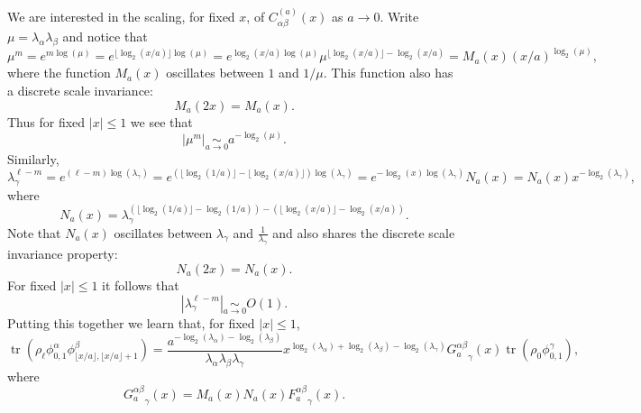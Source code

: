 \documentclass[prl,twocolumn,lengthcheck,superscriptaddress]{revtex4-1}
\newcommand{\tr}{\operatorname{tr}}
\theoremstyle{definition}
\theoremstyle{remark}
\begin{document}
We are interested in the scaling, for fixed $x$, of $C_{\alpha\beta}^{(a)}(x)$ as $a\rightarrow 0$. Write $\mu = \lambda_\alpha\lambda_\beta$ and notice that
\begin{equation}	
	\mu^{m} = e^{m\log(\mu)}	= e^{\lfloor \log_2(x/a)\rfloor \log(\mu)} = e^{\log_2(x/a) \log(\mu)}\mu^{\lfloor \log_2(x/a)\rfloor-\log_2(x/a) } = M_a(x) (x/a)^{\log_2(\mu)},
\end{equation}
where the function $M_a(x)$ oscillates between $1$ and $1/\mu$. This function also has a discrete scale invariance:
\begin{equation}
	M_a(2x) = M_a(x).
\end{equation}
Thus for fixed $|x| \le 1$ we see that
\begin{equation}
|\mu^{m}| \underset{a\rightarrow 0}{\sim} a^{-\log_2(\mu)}.
\end{equation}
Similarly,
\begin{equation}	
	\lambda_\gamma^{\ell-m} = e^{(\ell-m)\log(\lambda_\gamma)} = e^{(\lfloor \log_2(1/a)\rfloor-\lfloor \log_2(x/a)\rfloor) \log(\lambda_\gamma)} = e^{- \log_2(x) \log(\lambda_\gamma)}N_a(x) = N_a(x)x^{-\log_2(\lambda_\gamma)},
\end{equation}
where
\begin{equation}
	N_a(x) = \lambda_\gamma^{(\lfloor \log_2(1/a)\rfloor-  \log_2(1/a))-(\lfloor \log_2(x/a)\rfloor -\log_2(x/a))}.
\end{equation}
Note that $N_a(x)$ oscillates between $\lambda_\gamma$ and $\frac{1}{\lambda_\gamma}$ and also shares the discrete scale invariance property:
\begin{equation}
	 N_a(2x) = N_a(x). 
\end{equation}
For fixed $|x| \le1$ it follows that
\begin{equation}
	|\lambda_\gamma^{\ell-m}| \underset{a\rightarrow 0}{\sim} O(1).
\end{equation}
Putting this together we learn that, for fixed $|x| \le 1 $,
\begin{equation}
	\tr(\rho_{\ell}\phi_{0,1}^{\alpha}\phi_{\lfloor x/a \rfloor,\lfloor x/a \rfloor+1}^{\beta}) =  \frac{a^{-\log_2(\lambda_\alpha) -\log_2(\lambda_\beta)}}{\lambda_\alpha\lambda_\beta\lambda_\gamma} x^{\log_2(\lambda_\alpha)+\log_2(\lambda_\beta)-\log_2(\lambda_\gamma)}{G_a^{\alpha\beta}}_\gamma(x)\tr(\rho_{0} \phi_{0,1}^\gamma),
\end{equation}
where
\begin{equation}
	{G_a^{\alpha\beta}}_\gamma(x) = M_a(x)N_a(x){F_a^{\alpha\beta}}_\gamma(x).
\end{equation}
\end{document}
